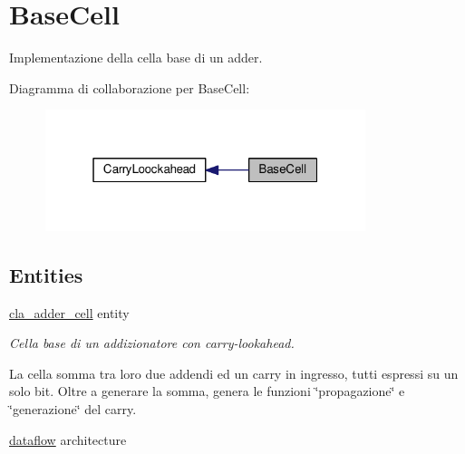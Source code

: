 \hypertarget{group___base_cell}{\section{Base\+Cell}
\label{group___base_cell}
}


Implementazione della cella base di un adder.  


Diagramma di collaborazione per Base\+Cell\+:\nopagebreak
\begin{figure}[H]
\begin{center}
\leavevmode
\includegraphics[width=265pt]{group___base_cell}
\end{center}
\end{figure}
\subsection*{Entities}
\begin{DoxyCompactItemize}
\item 
\hyperlink{classcla__adder__cell}{cla\+\_\+adder\+\_\+cell} entity
\begin{DoxyCompactList}\small\item\em Cella base di un addizionatore con carry-\/lookahead.

La cella somma tra loro due addendi ed un carry in ingresso, tutti espressi su un solo bit. Oltre a generare la somma, genera le funzioni \char`\"{}propagazione\char`\"{} e \char`\"{}generazione\char`\"{} del carry. \end{DoxyCompactList}\item 
\hyperlink{classcla__adder__cell_1_1dataflow}{dataflow} architecture
\end{DoxyCompactItemize}
